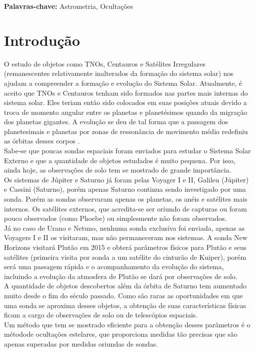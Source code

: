 \documentclass[12pt,a4paper]{monografia}
\begin{document}
\par
\vspace{1em}
\noindent\textbf{Palavras-chave:} Astrometria, Ocultações


\tableofcontents %
\thispagestyle{empty} %

\pagestyle{ruledheader}

\chapter{Introdução}
\label{Cap: intro}

\indent \indent O estudo de objetos como TNOs, Centauros e Satélites Irregulares (remanescentes relativamente inalterados da formação do sistema solar) nos ajudam a compreender a formação e evolução do Sistema Solar. Atualmente, é aceito que TNOs e Centauros tenham sido formados nas partes mais internas do sistema solar. Eles teriam então sido colocados em suas posições atuais devido a troca de momento angular entre os planetas e planetésimos quando da migração dos planetas gigantes. A evolução se deu de tal forma que a passagem dos planetesimais e planetas por zonas de ressonância de movimento médio redefiniu as órbitas desses corpos \citep{Tsiganis2005}.\\
\indent Sabe-se que poucas sondas espaciais foram enviados para estudar o Sistema Solar Externo e que a quantidade de objetos estudados é muito pequena. Por isso, ainda hoje, as observações de solo tem se mostrado de grande importância.\\
\indent Os sistemas de Júpiter e Saturno já foram pelas Voyager I e II, Galileu (Júpiter) e Cassini (Saturno), porém apenas Saturno continua sendo investigado por uma sonda. Porém as sondas observaram apenas os planetas, os anéis e satélites mais internos. Os satélites externos, que acredita-se ser oriundo de capturas ou foram pouco observados (como Phoebe) ou simplesmente não foram observados.\\
\indent Já no caso de Urano e Netuno, nenhuma sonda exclusiva foi enviada, apenas as Voyagers I e II os visitaram, mas não permaneceram nos sistemas. A sonda New Horizons visitará Plutão em 2015 e obterá parâmetros físicos para Plutão e seus satélites (primeira visita por sonda a um satélite do cinturão de Kuiper), porém será uma passagem rápida e o acompanhamento da evolução do sistema, incluindo a evolução da atmosfera de Plutão se dará por observações de solo.\\
\indent A quantidade de objetos descobertos além da órbita de Saturno tem aumentado muito desde o fim do século passado. Como são raras as oportunidades em que uma sonda se aproxima desses objetos, a obtenção de suas características físicas ficam a cargo de observações de solo ou de
telescópios espaciais.\\
\indent Um método que tem se mostrado eficiente para a obtenção desses parâmetros é o métodode ocultações estelares, que proporciona medidas tão precisas que são apenas superadas por medidas oriundas de sondas.
\end{document}
